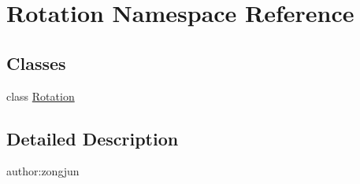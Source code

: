\hypertarget{namespace_rotation}{}\section{Rotation Namespace Reference}
\label{namespace_rotation}
\subsection*{Classes}
\begin{DoxyCompactItemize}
\item 
class \mbox{\hyperlink{class_rotation_1_1_rotation}{Rotation}}
\end{DoxyCompactItemize}


\subsection{Detailed Description}
\begin{DoxyVerb}author:zongjun
\end{DoxyVerb}
 